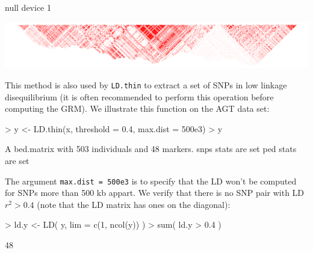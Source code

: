 \documentclass{article}
\renewenvironment{Schunk}{\vspace{\topsep}}{\vspace{\topsep}}
\begin{document}
\begin{center}
\begin{Schunk}
\begin{Soutput}
null device 
          1 
\end{Soutput}
\end{Schunk}
\includegraphics[width=\textwidth]{LD_AGT.pdf}
\end{center}

  This method is 
  also used by \verb!LD.thin! to extract a set of SNPs in low linkage disequilibrium
  (it is often recommended to perform this operation before computing the GRM). We illustrate
  this function on the AGT data set:

\begin{Schunk}
\begin{Sinput}
> y <- LD.thin(x, threshold = 0.4, max.dist = 500e3)
> y
\end{Sinput}
\begin{Soutput}
A bed.matrix with 503 individuals and 48 markers.
snps stats are set
ped stats are set
\end{Soutput}
\end{Schunk}

The argument \verb!max.dist = 500e3! is to specify that the LD won't be computed for
SNPs more than 500 kb appart. We verify that there is no SNP pair with LD $r^2 > 0.4$
(note that the LD matrix has ones on the diagonal):

\begin{Schunk}
\begin{Sinput}
> ld.y <- LD( y, lim = c(1, ncol(y)) )
> sum( ld.y > 0.4 )
\end{Sinput}
\begin{Soutput}
[1] 48
\end{Soutput}
\end{Schunk}

\vfill\eject
\end{document}
